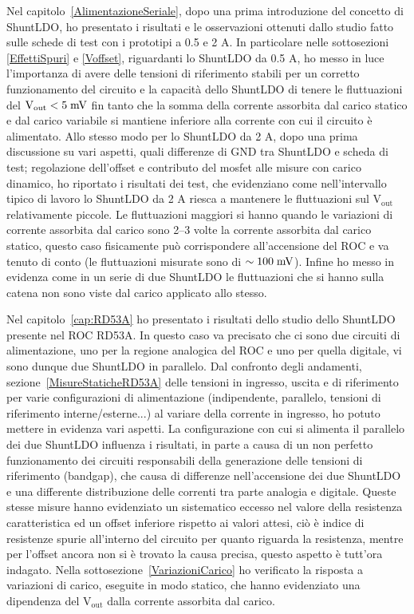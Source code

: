Nel capitolo~\ref{AlimentazioneSeriale}, dopo una prima introduzione del concetto di ShuntLDO, ho presentato i risultati e le osservazioni ottenuti dallo studio fatto sulle schede di test con i prototipi a 0.5 e 2 A. 
In particolare nelle sottosezioni \ref{EffettiSpuri} e \ref{Voffset}, riguardanti lo ShuntLDO da 0.5 A, ho messo in luce l'importanza di avere delle tensioni di riferimento stabili per un corretto funzionamento del circuito e la capacità dello ShuntLDO di tenere le fluttuazioni del $\mathrm{V_{out}<5 \rm \; mV}$ fin tanto che la somma della corrente assorbita dal carico statico e dal carico variabile si mantiene inferiore alla corrente con cui il circuito è alimentato. 
Allo stesso modo per lo ShuntLDO da 2 A, dopo una prima discussione su vari aspetti, quali differenze di GND tra ShuntLDO e scheda di test; regolazione dell'offset e contributo del mosfet alle misure con carico dinamico, ho riportato i risultati dei test, che evidenziano come nell'intervallo tipico di lavoro lo ShuntLDO da 2 A riesca a mantenere le fluttuazioni sul $\mathrm{V_{out}}$ relativamente piccole. 
Le fluttuazioni maggiori si hanno quando le variazioni di corrente assorbita dal carico sono 2--3 volte la corrente assorbita dal carico statico, questo caso fisicamente può corrispondere all'accensione del ROC e va tenuto di conto (le fluttuazioni misurate sono di $\sim 100 \rm \; mV$). 
Infine ho messo in evidenza come in un serie di due ShuntLDO le fluttuazioni che si hanno sulla catena non sono viste dal carico applicato allo stesso.

Nel capitolo~\ref{cap:RD53A} ho presentato i risultati dello studio dello ShuntLDO presente nel ROC RD53A. In questo caso va precisato che ci sono due circuiti di alimentazione, uno per la regione analogica del ROC e uno per quella digitale, vi sono dunque due ShuntLDO in parallelo. 
Dal confronto degli andamenti, sezione~\ref{MisureStaticheRD53A} delle tensioni in ingresso, uscita e di riferimento per varie configurazioni di alimentazione (indipendente, parallelo, tensioni di riferimento interne/esterne...) al variare della corrente in ingresso, ho potuto mettere in evidenza vari aspetti. 
La configurazione con cui si alimenta il parallelo dei due ShuntLDO influenza i risultati, in parte a causa di un non perfetto funzionamento dei circuiti responsabili della generazione delle tensioni di riferimento (bandgap), che causa di differenze nell'accensione dei due ShuntLDO e una differente distribuzione delle correnti tra parte analogia e digitale. 
Queste stesse misure hanno evidenziato un sistematico eccesso nel valore della resistenza caratteristica ed un offset inferiore  rispetto ai valori attesi, ciò è indice di resistenze spurie all'interno del circuito per quanto riguarda la resistenza, mentre per l'offset ancora non si è trovato la causa precisa, questo aspetto è tutt'ora indagato. 
Nella sottosezione~\ref{VariazioniCarico} ho verificato la risposta a variazioni di carico, eseguite in modo statico, che hanno evidenziato una dipendenza del $\mathrm{V_{out}}$ dalla corrente assorbita dal carico. %

